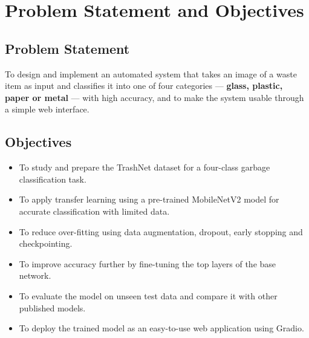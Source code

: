 \section{Problem Statement and Objectives}
\subsection{Problem Statement}
To design and implement an automated system that takes an image of a waste item as input and classifies it into one of four categories --- \textbf{glass, plastic, paper or metal} --- with high accuracy, and to make the system usable through a simple web interface.

\subsection{Objectives}
\begin{itemize}
  \item To study and prepare the TrashNet dataset for a four-class garbage classification task.
  \item To apply transfer learning using a pre-trained MobileNetV2 model for accurate classification with limited data.
  \item To reduce over-fitting using data augmentation, dropout, early stopping and checkpointing.
  \item To improve accuracy further by fine-tuning the top layers of the base network.
  \item To evaluate the model on unseen test data and compare it with other published models.
  \item To deploy the trained model as an easy-to-use web application using Gradio.
\end{itemize}
